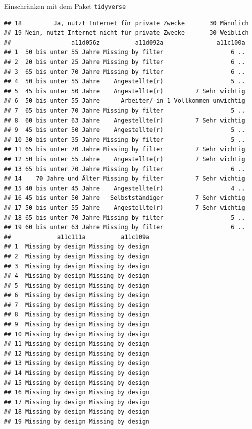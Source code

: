 \documentclass[ignorenonframetext,]{beamer}
\begin{document}
\begin{frame}[fragile]{Einschränken mit dem Paket \texttt{tidyverse}}
\begin{verbatim}
## 18         Ja, nutzt Internet für private Zwecke       30 Männlich
## 19 Nein, nutzt Internet nicht für private Zwecke       30 Weiblich
##                 a11d056z          a11d092a               a11c100a
## 1  50 bis unter 55 Jahre Missing by filter                   6 ..
## 2  20 bis unter 25 Jahre Missing by filter                   6 ..
## 3  65 bis unter 70 Jahre Missing by filter                   6 ..
## 4  50 bis unter 55 Jahre    Angestellte(r)                   5 ..
## 5  45 bis unter 50 Jahre    Angestellte(r)         7 Sehr wichtig
## 6  50 bis unter 55 Jahre      Arbeiter/-in 1 Vollkommen unwichtig
## 7  65 bis unter 70 Jahre Missing by filter                   5 ..
## 8  60 bis unter 63 Jahre    Angestellte(r)         7 Sehr wichtig
## 9  45 bis unter 50 Jahre    Angestellte(r)                   5 ..
## 10 30 bis unter 35 Jahre Missing by filter                   5 ..
## 11 65 bis unter 70 Jahre Missing by filter         7 Sehr wichtig
## 12 50 bis unter 55 Jahre    Angestellte(r)         7 Sehr wichtig
## 13 65 bis unter 70 Jahre Missing by filter                   6 ..
## 14    70 Jahre und Älter Missing by filter         7 Sehr wichtig
## 15 40 bis unter 45 Jahre    Angestellte(r)                   4 ..
## 16 45 bis unter 50 Jahre   Selbstständiger         7 Sehr wichtig
## 17 50 bis unter 55 Jahre    Angestellte(r)         7 Sehr wichtig
## 18 65 bis unter 70 Jahre Missing by filter                   5 ..
## 19 60 bis unter 63 Jahre Missing by filter                   6 ..
##             a11c111a          a11c109a
## 1  Missing by design Missing by design
## 2  Missing by design Missing by design
## 3  Missing by design Missing by design
## 4  Missing by design Missing by design
## 5  Missing by design Missing by design
## 6  Missing by design Missing by design
## 7  Missing by design Missing by design
## 8  Missing by design Missing by design
## 9  Missing by design Missing by design
## 10 Missing by design Missing by design
## 11 Missing by design Missing by design
## 12 Missing by design Missing by design
## 13 Missing by design Missing by design
## 14 Missing by design Missing by design
## 15 Missing by design Missing by design
## 16 Missing by design Missing by design
## 17 Missing by design Missing by design
## 18 Missing by design Missing by design
## 19 Missing by design Missing by design
\end{verbatim}

\end{frame}
\end{document}
